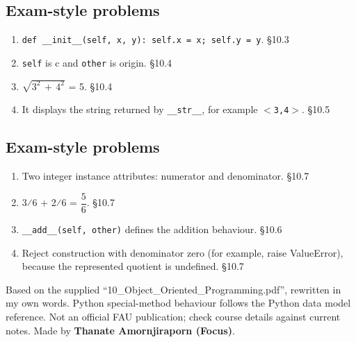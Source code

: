 \documentclass[11pt]{article}
\begin{document}
\begin{keepsection}\subsection{Exam-style problems}

\begin{enumerate}
\item \texttt{def \_\_init\_\_(self, x, y): self.x = x; self.y = y}. \hfill{\small\color{FAUblue}§10.3}
\item \texttt{self} is c and \texttt{other} is origin. \hfill{\small\color{FAUblue}§10.4}
\item \ensuremath{\sqrt{3^{2}\, +\, 4^{2}}} = 5. \hfill{\small\color{FAUblue}§10.4}
\item It displays the string returned by \texttt{\_\_str\_\_}, for example \texttt{\ensuremath{<}3,4\ensuremath{>}}. \hfill{\small\color{FAUblue}§10.5}
\end{enumerate}

\end{keepsection}
\begin{keepsection}\subsection{Exam-style problems}

\begin{enumerate}
\item Two integer instance attributes: numerator and denominator. \hfill{\small\color{FAUblue}§10.7}
\item 3⁄6 + 2⁄6 = {\small\ensuremath{\dfrac{5}{6}}}. \hfill{\small\color{FAUblue}§10.7}
\item \texttt{\_\_add\_\_(self, other)} defines the addition behaviour. \hfill{\small\color{FAUblue}§10.6}
\item Reject construction with denominator zero (for example, raise ValueError), because the represented quotient is undefined. \hfill{\small\color{FAUblue}§10.7}
\end{enumerate}

\end{keepsection}

\vfill{\small Based on the supplied “10\_Object\_Oriented\_Programming.pdf”, rewritten in my own words. Python special-method behaviour follows the Python data model reference. Not an official FAU publication; check course details against current notes. Made by \textbf{Thanate Amornjiraporn (Focus)}.}
\end{document}

